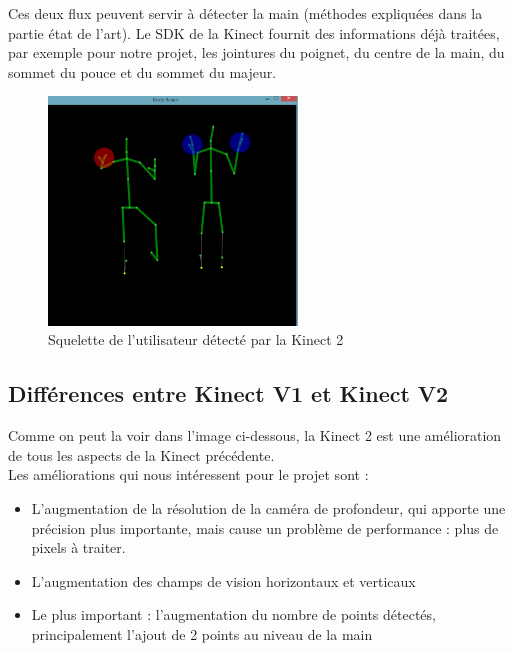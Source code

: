 Ces deux flux peuvent servir à détecter la main (méthodes expliquées dans la partie état de l'art).
Le SDK de la Kinect fournit des informations déjà traitées, 
par exemple pour notre projet, les jointures du poignet, du centre de la main, du sommet du pouce et du sommet du majeur.

\begin{figure}[H]
\center
\includegraphics[width=250px]{images/kinec2_skel.png}
\caption{Squelette de l'utilisateur détecté par la Kinect 2}
\label{fig:skeleton_kinect2}
\end{figure}

\subsection{Différences entre Kinect V1 et Kinect V2}

Comme on peut la voir dans l'image ci-dessous, la Kinect 2 est une amélioration de tous les aspects de la Kinect précédente.\\

Les améliorations qui nous intéressent pour le projet sont : 
\begin{itemize}
 \item L'augmentation de la résolution de la caméra de profondeur, qui apporte une précision plus importante, mais cause un problème de performance : plus de pixels à traiter.
 \item L'augmentation des champs de vision horizontaux et verticaux
 \item Le plus important : l'augmentation du nombre de points détectés, principalement l'ajout de 2 points au niveau de la main
\end{itemize}

